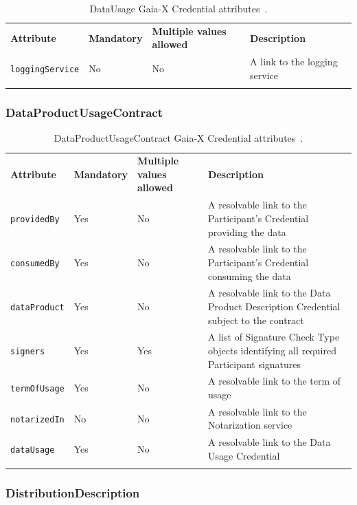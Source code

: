 \begin{longtable}{ |p{4cm}|p{2cm}|p{2cm}|p{7cm}| }
    \hhline{----}
    \textbf{Attribute} & \textbf{Mandatory} & \textbf{Multiple values allowed} & \textbf{Description}\\
    \hhline{----}
    \texttt{loggingService} & No & No & A link to the logging service\\
    \hhline{----}
    \caption{DataUsage Gaia-X Credential attributes~\cite{gaiax_data_exchange_document}.}
    \label{tab:data_usage}
\end{longtable}

\subsubsection{DataProductUsageContract}

\begin{longtable}{ |p{4cm}|p{2cm}|p{2cm}|p{7cm}| }
    \hhline{----}
    \textbf{Attribute} & \textbf{Mandatory} & \textbf{Multiple values allowed} & \textbf{Description}\\
    \hhline{----}
    \texttt{providedBy} & Yes & No & A resolvable link to the Participant's Credential providing the data\\
    \hhline{----}
    \texttt{consumedBy} & Yes & No & A resolvable link to the Participant's Credential consuming the data\\
    \hhline{----}
    \texttt{dataProduct} & Yes & No & A resolvable link to the Data Product Description Credential subject to the contract\\
    \hhline{----}
    \texttt{signers} & Yes & Yes & A list of Signature Check Type objects identifying all required Participant signatures\\
    \hhline{----}
    \texttt{termOfUsage} & Yes & No & A resolvable link to the term of usage\\
    \hhline{----}
    \texttt{notarizedIn} & No & No & A resolvable link to the Notarization service\\
    \hhline{----}
    \texttt{dataUsage} & Yes & No & A resolvable link to the Data Usage Credential\\
    \hhline{----}
    \caption{DataProductUsageContract Gaia-X Credential attributes~\cite{gaiax_data_exchange_document}.}
    \label{tab:data_product_usage_contract}
\end{longtable}

\subsubsection{DistributionDescription}

